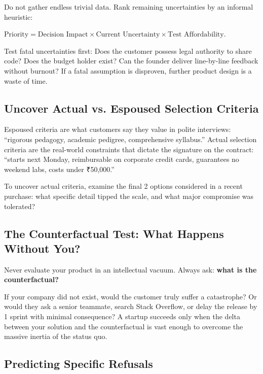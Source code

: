 Do not gather endless trivial data. Rank remaining uncertainties by an informal heuristic:
\begin{center}
\small
$\text{Priority} = \text{Decision Impact} \times \text{Current Uncertainty} \times \text{Test Affordability}$.
\end{center}
Test fatal uncertainties first: Does the customer possess legal authority to share code? Does the budget holder exist? Can the founder deliver line-by-line feedback without burnout? If a fatal assumption is disproven, further product design is a waste of time.

\subsection{Uncover Actual vs. Espoused Selection Criteria}

Espoused criteria are what customers say they value in polite interviews: ``rigorous pedagogy, academic pedigree, comprehensive syllabus.'' Actual selection criteria are the real-world constraints that dictate the signature on the contract: ``starts next Monday, reimbursable on corporate credit cards, guarantees no weekend labs, costs under ₹50,000.''

To uncover actual criteria, examine the final 2 options considered in a recent purchase: what specific detail tipped the scale, and what major compromise was tolerated?

\subsection{The Counterfactual Test: What Happens Without You?}

Never evaluate your product in an intellectual vacuum. Always ask: \textbf{what is the counterfactual?}

If your company did not exist, would the customer truly suffer a catastrophe? Or would they ask a senior teammate, search Stack Overflow, or delay the release by 1 sprint with minimal consequence? A startup succeeds only when the delta between your solution and the counterfactual is vast enough to overcome the massive inertia of the status quo.

\subsection{Predicting Specific Refusals}


